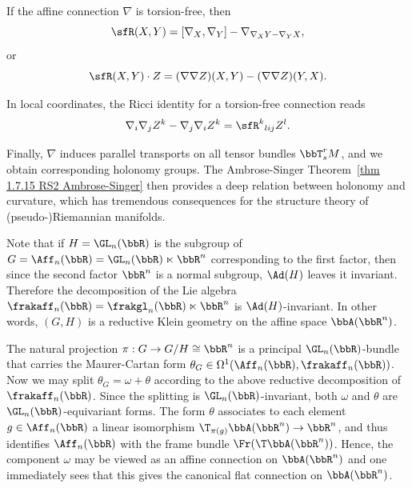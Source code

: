 \begin{cor}
    If the affine connection $\nabla$ is torsion-free, then 
    \[\sfR(X,Y)=[\nabla_X,\nabla_Y]-\nabla_{\nabla_X Y-\nabla_Y X},\]
    or
    \[\sfR(X,Y)\cdot Z=(\nabla\nabla Z)(X,Y)-(\nabla\nabla Z)(Y,X).\]
\end{cor}

\begin{rem}
    In local coordinates, the Ricci identity for a torsion-free connection reads 
    \[\nabla_i \nabla_j Z^k-\nabla_j\nabla_i Z^k=\sfR^k{}_{lij}Z^l.\]
\end{rem}

Finally, $\nabla$ induces parallel transports on all tensor bundles $\bbT^r_s M$, and we obtain corresponding holonomy groups. The Ambrose-Singer Theorem~\ref{thm 1.7.15 RS2 Ambrose-Singer} then provides a deep relation between holonomy and curvature, which has tremendous consequences for the structure theory of (pseudo-)Riemannian manifolds.


\begin{rem}\label{rem 1.3.5 Cap}
    Note that if $H=\GL_n(\bbR)$ is the subgroup of $G=\Aff_n(\bbR)=\GL_n(\bbR)\ltimes \bbR^n$ corresponding to the first factor, then since the second factor $\bbR^n$ is a normal subgroup, $\Ad(H)$ leaves it invariant. Therefore the decomposition of the Lie algebra $\frakaff_n(\bbR)=\frakgl_n(\bbR)\ltimes \bbR^n$ is $\Ad(H)$-invariant. In other words, $(G,H)$ is a reductive Klein geometry on the affine space $\bbA(\bbR^n)$.

    The natural projection $\pi:G\to G\slash H\cong \bbR^n$ is a principal $\GL_n(\bbR)$-bundle that carries the Maurer-Cartan form $\theta_G\in\Omega^1(\Aff_n(\bbR),\frakaff_n(\bbR))$. Now we may split $\theta_G=\omega+\theta$ according to the above reductive decomposition of $\frakaff_n(\bbR)$. Since the splitting is $\GL_n(\bbR)$-invariant, both $\omega$ and $\theta$ are $\GL_n(\bbR)$-equivariant forms. The form $\theta$ associates to each element $g\in \Aff_n(\bbR)$ a linear isomorphism $\T_{\pi(g)}\bbA(\bbR^n)\to \bbR^n$, and thus identifies $\Aff_n(\bbR)$ with the frame bundle $\Fr(\T \bbA(\bbR^n))$. Hence, the component $\omega$ may be viewed as an affine connection on $\bbA(\bbR^n)$ and one immediately sees that this gives the canonical flat connection on $\bbA(\bbR^n)$.
\end{rem}

